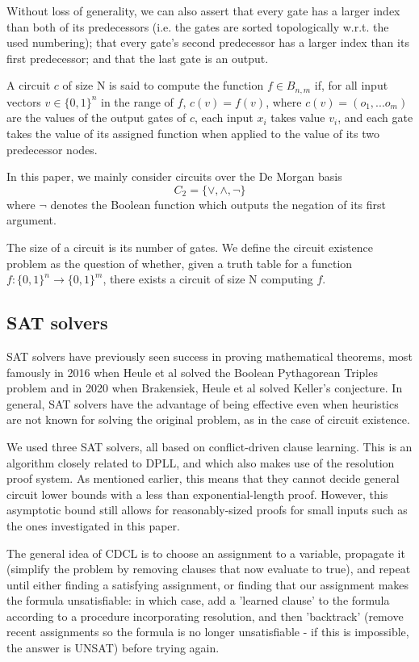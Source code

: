 \documentclass{article}
\begin{document}
Without loss of generality, we can also assert that every gate has a larger index than both of its predecessors (i.e. the gates are sorted topologically w.r.t. the used numbering); that every gate's second predecessor has a larger index than its first predecessor; and that the last gate is an output.~\cite{kulikov}

A circuit \(c\) of size N is said to compute the function \(f\in B_{n,m}\) if, for all input vectors \(v\in\{0,1\}^n\) in the range of \(f\), \(c(v)=f(v)\), where \(c(v) = (o_1,...o_m)\) are the values of the output gates of \(c\), each input \(x_i\) takes value \(v_i\), and each gate takes the value of its assigned function when applied to the value of its two predecessor nodes.

In this paper, we mainly consider circuits over the De Morgan basis \[C_2 = \{\lor, \land, \neg\}\] where \(\neg\) denotes the Boolean function which outputs the negation of its first argument.

The size of a circuit is its number of gates. We define the circuit existence problem as the question of whether, given a truth table for a function \(f: \{0,1\}^n \to \{0,1\}^m\), there exists a circuit of size N computing \(f\).

\subsection{SAT solvers}

SAT solvers have previously seen success in proving mathematical theorems, most famously in 2016 when Heule et al solved the Boolean Pythagorean Triples problem\cite{heule} and in 2020 when Brakensiek, Heule et al solved Keller's conjecture\cite{heule2}. In general, SAT solvers have the advantage of being effective even when heuristics are not known for solving the original problem, as in the case of circuit existence.

We used three SAT solvers, all based on conflict-driven clause learning. This is an algorithm closely related to DPLL, and which also makes use of the resolution proof system.\cite{cdcl}\cite{krajicek} As mentioned earlier, this means that they cannot decide general circuit lower bounds with a less than exponential-length proof.\cite{raz} However, this asymptotic bound still allows for reasonably-sized proofs for small inputs such as the ones investigated in this paper. 

The general idea of CDCL is to choose an assignment to a variable, propagate it (simplify the problem by removing clauses that now evaluate to true), and repeat until either finding a satisfying assignment, or finding that our assignment makes the formula unsatisfiable: in which case, add a 'learned clause' to the formula according to a procedure incorporating resolution, and then 'backtrack' (remove recent assignments so the formula is no longer unsatisfiable - if this is impossible, the answer is UNSAT) before trying again.
\end{document}
